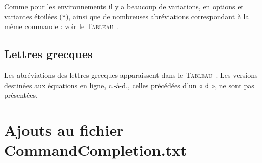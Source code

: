 \documentclass[11pt,french]{article}
\newcommand{\CCT}{\textsf{CommandCompletion.txt}}
\begin{document}
Comme pour les environnements il y a beaucoup de variations, en options et variantes étoilées (\texttt{*}), ainsi que de nombreuses abréviations correspondant à la même commande : voir le \textsc{Tableau}~.


\subsection*{Lettres grecques}

Les abréviations des lettres grecques apparaissent dans le \textsc{Tableau}~. Les versions destinées aux équations en ligne, c.-à-d., celles précédées d'un « \texttt{d} », ne sont pas présentées.


\section*{Ajouts au fichier \CCT}
\end{document}
